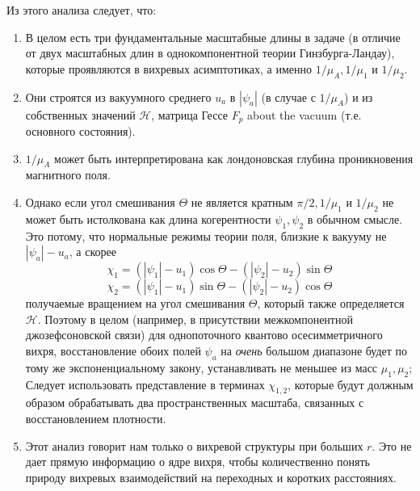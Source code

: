 Из этого анализа следует, что:
\begin{enumerate}
    \item В целом есть три фундаментальные масштабные длины в задаче (в 
        отличие от двух масштабных длин в однокомпонентной теории 
        Гинзбурга-Ландау), которые проявляются в вихревых асимптотиках, а 
        именно \( 1/\mu_A, 1/\mu_1 \) и \( 1/\mu_2 \).
    \item Они строятся из вакуумного среднего \( u_a \) в \( |\psi_a| \) 
        (в случае с \( 1/\mu_A \)) и из собственных значений 
        \( \mathcal{H} \), матрица Гессе \( F_p \) about the vacuum (т.е. 
        основного состояния).
    \item \( 1/\mu_{A} \) может быть интерпретирована как лондоновская глубина 
        проникновения магнитного поля.
    \item Однако если угол смешивания \( \Theta \) не является кратным  
        \( \pi/2, 1/\mu_1 \) и \( 1/\mu_2 \) не может быть истолкована как 
        длина когерентности \( \psi_1, \psi_2 \) в обычном смысле. Это потому, 
        что нормальные режимы теории поля, близкие к вакууму не 
        \( |\psi_a| - u_a \), а скорее
        \[ 
            \chi_1 = (|\psi_1| - u_1)\cos\Theta - (|\psi_2| - u_2)\sin\Theta 
        \]
        \[ 
            \chi_2 = (|\psi_1| - u_1)\sin\Theta - (|\psi_2| - u_2)\cos\Theta 
        \]
        получаемые вращением на угол смешивания \( \Theta \), который также 
        определяется \( \mathcal{H} \). Поэтому в целом (например, в 
        присутствии межкомпонентной джозефсоновской связи) для однопоточного
        квантово осесимметричного вихря, восстановление обоих полей
        \( \psi_a \) на \textit{очень} большом диапазоне будет по тому же 
        экспоненциальному закону, устанавливать не меньшее из масс 
        \( \mu_1, \mu_2 \); Следует использовать представление в терминах 
        \( \chi_{1,2} \), которые будут должным образом обрабатывать два 
        пространственных масштаба, связанных с восстановлением плотности.
    \item Этот анализ говорит нам только о вихревой структуры при больших
        \( r \). Это не дает прямую информацию о ядре вихря, чтобы 
        количественно понять природу вихревых взаимодействий на переходных 
        и коротких расстояниях.
\end{enumerate}

